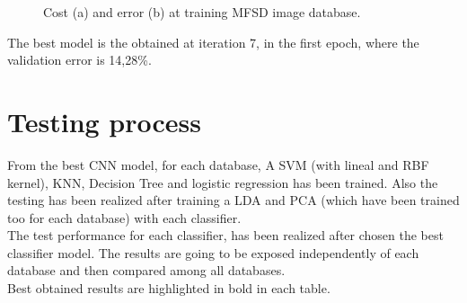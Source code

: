 \begin{figure}[htb]
\centering
\caption{Cost (a) and error (b) at training MFSD image database.}
\label{fig:ejecucion2_mfsd_train}
\end{figure}

The best model is the obtained at iteration 7, in the first epoch, where the validation error is 14,28\%.

\section{Testing process}
From the best CNN model, for each database, A SVM (with lineal and RBF kernel), KNN, Decision Tree and logistic regression has been trained. Also the testing has been realized after training a LDA and PCA (which have been trained too for each database) with each classifier.\\

The test performance for each classifier, has been realized after chosen the best classifier model.  The results are going to be exposed independently of each database and then compared among all databases.\\

Best obtained results are highlighted in bold in each table.

